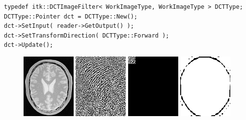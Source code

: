 \small
\begin{verbatim}
typedef itk::DCTImageFilter< WorkImageType, WorkImageType > DCTType;
DCTType::Pointer dct = DCTType::New();
dct->SetInput( reader->GetOutput() );
dct->SetTransformDirection( DCTType::Forward );
dct->Update();
\end{verbatim}
\normalsize

\begin{figure}
\center
\includegraphics[width=0.24\textwidth]{images/appendix/brain.png}
\includegraphics[width=0.24\textwidth]{images/appendix/dct.png}
\includegraphics[width=0.24\textwidth]{images/appendix/dctFiltered.png}
\includegraphics[width=0.24\textwidth]{images/appendix/filtered.png}
\label{fig:DCT}
\end{figure}

